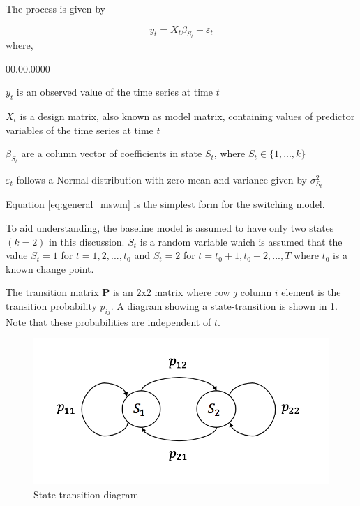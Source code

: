 The process is given by \citep{hamilton1989new}

\begin{equation}
y_{t}=X_{t}\beta_{S_{t}}+\varepsilon_{t}\label{eq:general_mswm}
\end{equation}
where, 
\begin{labeling}{00.00.0000}
\item [{$y_{t}$}] is an observed value of the time series at time $t$
\item [{$X_{t}$}] is a design matrix, also known as model matrix, containing
values of predictor variables of the time series at time $t$
\item [{$\beta_{S_{t}}$}] are a column vector of coefficients in state
$S_{t}$, where $S_{t}\in\{1,...,k\}$ %

\item [{$\varepsilon_{t}$}] follows a Normal distribution with zero mean
and variance given by $\sigma_{S_{t}}^{2}$ 
\end{labeling}
Equation \ref{eq:general_mswm} is the simplest form for the switching
model.%

{} To aid understanding, the baseline model is assumed to have only
two states $(k=2)$ in this discussion. $S_{t}$ is a random variable
which is assumed that the value $S_{t}=1$ for $t=1,2,...,t_{0}$
and $S_{t}=2$ for $t=t_{0}+1,t_{0}+2,...,T$ where $t_{0}$ is a
known change point. 

The transition matrix $\mathbf{P}$ is an $2\mathrm{x}2$ matrix where
row $j$ column $i$ element is the transition probability $p_{ij}$.
A diagram showing a state-transition is shown in \ref{transition}.
Note that these probabilities are independent of $t$.

\begin{figure}[H]
\begin{centering}
\includegraphics[scale=0.6]{picture/transition}
\par\end{centering}
\caption{State-transition diagram}
\label{transition}
\end{figure}

